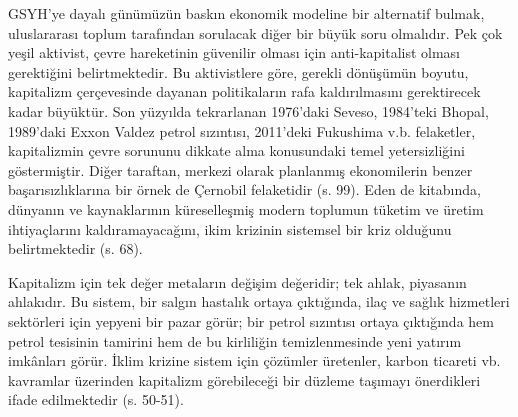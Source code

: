 \documentclass[
]{book}
\begin{document}
GSYH'ye dayalı günümüzün baskın ekonomik modeline bir alternatif bulmak, uluslararası toplum tarafından sorulacak diğer bir büyük soru olmalıdır. Pek çok yeşil aktivist, çevre hareketinin güvenilir olması için anti-kapitalist olması gerektiğini belirtmektedir. Bu aktivistlere göre, gerekli dönüşümün boyutu, kapitalizm çerçevesinde dayanan politikaların rafa kaldırılmasını gerektirecek kadar büyüktür. Son yüzyılda tekrarlanan 1976'daki Seveso, 1984'teki Bhopal, 1989'daki Exxon Valdez petrol sızıntısı, 2011'deki Fukushima v.b. felaketler, kapitalizmin çevre sorununu dikkate alma konusundaki temel yetersizliğini göstermiştir. Diğer taraftan, merkezi olarak planlanmış ekonomilerin benzer başarısızlıklarına bir örnek de Çernobil felaketidir (s. 99). \citep{ponthieu2019climate} Eden de kitabında, dünyanın ve kaynaklarının küreselleşmiş modern toplumun tüketim ve üretim ihtiyaçlarını kaldıramayacağını, ikim krizinin sistemsel bir kriz olduğunu belirtmektedir (s. 68). \citep{eden2015iklim}

Kapitalizm için tek değer metaların değişim değeridir; tek ahlak, piyasanın ahlakıdır. Bu sistem, bir salgın hastalık ortaya çıktığında, ilaç ve sağlık hizmetleri sektörleri için yepyeni bir pazar görür; bir petrol sızıntısı ortaya çıktığında hem petrol tesisinin tamirini hem de bu kirliliğin temizlenmesinde yeni yatırım imkânları görür. İklim krizine sistem için çözümler üretenler, karbon ticareti vb. kavramlar üzerinden kapitalizm görebileceği bir düzleme taşımayı önerdikleri ifade edilmektedir (s. 50-51). \citep{eden2015iklim}
\end{document}

